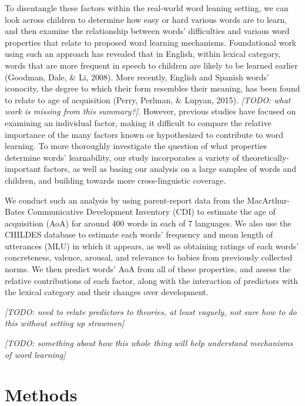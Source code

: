 \documentclass[10pt, letterpaper]{article}
\begin{document}
To disentangle these factors within the real-world word leaning setting,
we can look across children to determine how easy or hard various words
are to learn, and then examine the relationship between words'
difficulties and various word properties that relate to proposed word
learning mechanisms. Foundational work using such an approach has
revealed that in English, within lexical category, words that are more
frequent in speech to children are likely to be learned earlier
(Goodman, Dale, \& Li, 2008). More recently, English and Spanish words'
iconocity, the degree to which their form resembles their meaning, has
been found to relate to age of acquisition (Perry, Perlman, \& Lupyan,
2015). \emph{{[}TODO: what work is missing from this summary?{]}}.
However, previous studies have focused on examining an individual
factor, making it difficult to compare the relative importance of the
many factors known or hypothesized to contribute to word learning. To
more thoroughly investigate the question of what properties determine
words' learnability, our study incorporates a variety of
theoretically-important factors, as well as basing our analysis on a
large samples of words and children, and building towards more
cross-linguistic coverage.

We conduct such an analysis by using parent-report data from the
MacArthur-Bates Communicative Development Inventory (CDI) to estimate
the age of acquisition (AoA) for around 400 words in each of 7
languages. We also use the CHILDES database to estimate each words'
frequency and mean length of utterances (MLU) in which it appears, as
well as obtaining ratings of each words' concreteness, valence, arousal,
and relevance to babies from previously collected norms. We then predict
words' AoA from all of these properties, and assess the relative
contributions of each factor, along with the interaction of predictors
with the lexical category and their changes over development.

\emph{{[}TODO: need to relate predictors to theories, at least vaguely,
not sure how to do this without setting up strawmen{]}}

\emph{{[}TODO: something about how this whole thing will help understand
mechanisms of word learning{]}}

\newpage

\section{Methods}\label{methods}
\end{document}

